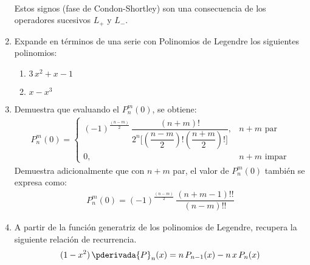 \begin{enumerate}
\begin{align*}
\end{align*}
Estos signos (fase de Condon-Shortley) son una consecuencia de los operadores sucesivos $L_{+}$ y $L_{-}$.
\item Expande en términos de una serie con Polinomios de Legendre los siguientes polinomios:
\begin{enumerate}[label=\alph*)]
\item $3 \, x^{2} + x - 1$
\item $x - x^{3}$
\end{enumerate}
\item Demuestra que evaluando el $P_{n}^{m}(0)$, se obtiene:
\begin{align*}
P_{n}^{m} (0) = \begin{cases}
(-1)^{\frac{(n-m)}{2}} \, \dfrac{(n + m)!}{2^{n} \bigg[ \left( \dfrac{n - m}{2} \right)! \left( \dfrac{n + m}{2} \right)! \bigg]}, & n + m \mbox{ par} \\
0, & n + m \mbox{ impar}
\end{cases}
\end{align*}
Demuestra adicionalmente que con $n + m$ par, el valor de $P_{n}^{m}(0)$ también se expresa como:
\begin{align*}
P_{n}^{m}(0) = (-1)^{\frac{(n-m)}{2}} \, \dfrac{(n + m - 1)!!}{(n - m)!!}
\end{align*}
\item A partir de la función generatriz de los polinomios de Legendre, recupera la siguiente relación de recurrencia.
\begin{align*}
(1 - x^{2}) \, \pderivada{P}_{n} (x) = n \, P_{n-1} (x) - n \, x \, P_{n} (x)
\end{align*}


\end{enumerate}

